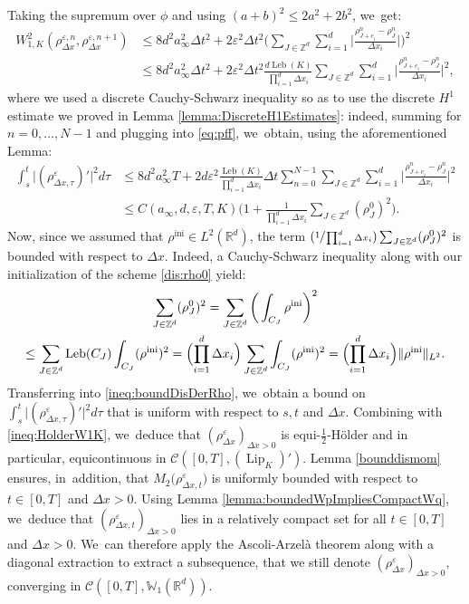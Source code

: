 \documentclass[JEP,XML,SOM,Unicode, NoFloatCountersInSection,published]{cedram}
\newcommand{\Psfrac}[2]{(\sfrac{#1}{#2})}
\newcommand{\ini}{\mathrm{ini}}
\DeclareMathOperator{\Leb}{Leb}
\DeclareMathOperator{\Lip}{Lip}
\def\RR{\mathbb{R}}
\def\ZZ{\mathbb{Z}}
\def\WW{\mathbb{W}}
\def\eps{\varepsilon}
\def\dt{\Delta t}
\def\dx{\Delta x}
\def\calC{{\mathcal C}}
\theoremstyle{plain}
\theoremstyle{definition}
\begin{document}
Taking the supremum over $\phi$ and using $(a + b)^2 \leq 2a^2 + 2b^2$, we~get:
\begin{align*}
W_{1,K}^2(\rho_{\dx}^{\eps,n}, \rho_{\dx}^{\eps,n+1}) & \leq 8d^2 a_\infty^2 \dt^2 + 2\eps^2 \dt^2 \bigg(\sum_{J \in \ZZ^d} \sum_{i=1}^{d} \Big|\frac{\rho_{J+e_i}^{n} - \rho_J^{n}}{\dx_i}\Big|\bigg)^2 \\
& \leq 8d^2 a_\infty^2 \dt^2 + 2 \eps^2 \dt^2 \frac{d \Leb(K)}{\prod_{i=1}^d \dx_i} \sum_{J \in \ZZ^d} \sum_{i=1}^{d} \Big|\frac{\rho_{J+e_i}^{n} - \rho_J^{n}}{\dx_i}\Big|^2,
\end{align*}
where we used a discrete Cauchy-Schwarz inequality so as to use the discrete $H^1$ estimate we proved in Lemma \ref{lemma:DiscreteH1Estimates}: indeed, summing for $n=0,\ldots, N-1$ and plugging into \eqref{eq:pff}, we~obtain, using the aforementioned Lemma:
\begin{equation}\label{ineq:boundDisDerRho}
\begin{aligned}
\int_s^t \big|(\rho_{\dx,\tau}^\eps)'\big|^2 d\tau & \leq 8d^2 a_\infty^2 T + 2 d \eps^2 \frac{\Leb(K)}{\prod_{i=1}^d \dx_i} \dt \sum_{n=0}^{N-1} \sum_{J \in \ZZ^d} \sum_{i=1}^{d} \Big|\frac{\rho_{J+e_i}^{n} - \rho_J^{n}}{\dx_i}\Big|^2 \\
& \leq C(a_\infty,d, \eps, T, K) \Big(1 + \frac{1}{\prod_{i=1}^d \dx_i}\sum_{J\in\ZZ^d}(\rho_J^0)^2 \Big).
\end{aligned}
\end{equation}
Now, since we assumed that $\rho^{\ini} \in L^2(\RR^d)$, the term $\Psfrac{1}{\prod_{i=1}^d \dx_i}\sum_{J\in\ZZ^d}(\rho_J^0)^2$ is bounded with respect to $\dx$. Indeed, a Cauchy-Schwarz inequality along with our initialization of the scheme \eqref{dis:rho0} yield:
\begin{multline*}
\sum_{J\in\ZZ^d}(\rho_J^0)^2 = \sum_{J\in\ZZ^d} \bigg(\int_{C_J} \rho^{\ini}\bigg)^2 \\
\leq \sum_{J\in\ZZ^d} \Leb(C_J) \int_{C_J}(\rho^{\ini})^2 = \Bigl(\prod_{i=1}^d \dx_i\Bigr) \sum_{J\in\ZZ^d} \int_{C_J}(\rho^{\ini})^2 = \Bigl(\prod_{i=1}^d \dx_i\Bigr) \|\rho^{\ini}\|_{L^2}.
\end{multline*}
Transferring into \eqref{ineq:boundDisDerRho}, we~obtain a bound on $\int_s^t \big|(\rho_{\dx,\tau}^\eps)'\big|^2 d\tau$ that is uniform with respect to $s, t$ and $\dx$. Combining with \eqref{ineq:HolderW1K}, we~deduce that $(\rho_{\dx}^\eps)_{\dx > 0}$ is equi-$\frac 12$\nobreakdash-Hölder and in particular, equicontinuous in $\calC([0,T], (\Lip_K)')$. Lemma \ref{bounddismom} ensures, in~addition, that $M_2\big(\rho_{\dx,t}^\eps\big)$ is uniformly bounded with respect to $t \in [0,T]$ and $\dx>0$. Using Lemma \ref{lemma:boundedWpImpliesCompactWq}, we~deduce that $(\rho_{\dx,t}^\eps)_{\dx > 0}$ lies in a relatively compact set for all $t \in [0,T]$ and $\dx>0$. We~can therefore apply the Ascoli-Arzelà theorem along with a diagonal extraction to extract a subsequence, that we still denote $(\rho_{\dx}^\eps)_{\dx > 0}$, converging in
$\calC([0,T], \WW_1(\RR^d))$.
\end{document}
